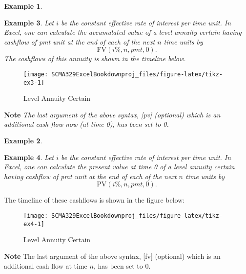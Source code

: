 \documentclass[
]{article}
\theoremstyle{definition}
\theoremstyle{definition}
\newtheorem{example}{Example}[section]
\theoremstyle{definition}
\theoremstyle{definition}
\theoremstyle{remark}
\begin{document}
\begin{example}
\protect\hypertarget{exm:unlabeled-div-5}{}\label{exm:unlabeled-div-5}

\textbf{Example 3}. \emph{Let \(i\) be the constant effective rate of interest per
time unit. In Excel, one can calculate the accumulated value of a level
annuity certain having cashflow of pmt unit at the end of each of the
next \(n\) time units by \[\text{FV}(i\%, n, pmt, 0).\] The cashflows of
this annuity is shown in the timeline below.}

\begin{figure}

{\centering \texttt{[image: SCMA329ExcelBookdownproj\_files/figure-latex/tikz-ex3-1]} 

}

\caption{Level Annuity Certain}\label{fig:tikz-ex3}
\end{figure}

\textbf{Note}
\emph{The last argument of the above syntax, {[}pv{]} (optional) which is an
additional cash flow now (at time 0), has been set to 0.}

\end{example}

\begin{example}
\protect\hypertarget{exm:unlabeled-div-6}{}\label{exm:unlabeled-div-6}

\textbf{Example 4}. \emph{Let \(i\) be the constant effective rate of interest per
time unit. In Excel, one can calculate the present value at time 0 of a
level annuity certain having cashflow of pmt unit at the end of each of
the next \(n\) time units by \[\text{PV}(i\%, n, pmt, 0).\]}

\end{example}

The timeline of these cashflows is shown in the figure below:

\begin{figure}

{\centering \texttt{[image: SCMA329ExcelBookdownproj\_files/figure-latex/tikz-ex4-1]} 

}

\caption{Level Annuity Certain}\label{fig:tikz-ex4}
\end{figure}

\textbf{Note}
The last argument of the above syntax, {[}fv{]} (optional) which is an
additional cash flow at time \(n\), has been set to 0.
\end{document}
